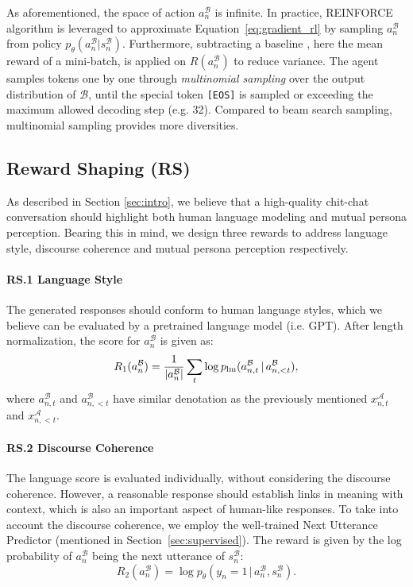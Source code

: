 \documentclass[11pt,a4paper]{article}
\begin{document}
As aforementioned, the space of action $a^\mathcal{B}_n$ is infinite. In practice, REINFORCE algorithm \cite{williams1992simple} is leveraged to approximate Equation~\ref{eq:gradient_rl} by sampling $a^\mathcal{B}_n$ from policy $p_{\theta}(a^\mathcal{B}_n|s^\mathcal{B}_n)$. Furthermore, subtracting a baseline \cite{weaver2001optimal}, here the mean reward of a mini-batch, is applied on $R(a^\mathcal{B}_n)$ to reduce variance. The agent samples tokens one by one through \emph{multinomial sampling} over the output distribution of $\mathcal{B}$, until the special token \texttt{[EOS]} is sampled or exceeding the maximum allowed decoding step (e.g. 32). Compared to beam search sampling, multinomial sampling provides more diversities.

\subsection{Reward Shaping (RS)}\label{sec:reward}

As described in Section \ref{sec:intro}, we believe that a high-quality chit-chat conversation should highlight both human language modeling and mutual persona perception. Bearing this in mind, we design three rewards to address language style, discourse coherence and mutual persona perception respectively.

\paragraph{RS.1 Language Style} The generated responses should conform to human language styles, which we believe can be evaluated by a pretrained language model (i.e. GPT). After length normalization, the score for $a^\mathcal{B}_n$ is given as:
\begin{equation}
    R_1(a^\mathcal{B}_n) = \frac{1}{|a^\mathcal{B}_n|}\sum\limits_{t}\log p_{\rm{lm}}(a^\mathcal{B}_{n,t}\,|\,a^\mathcal{B}_{n,<t}),
\end{equation}
where $a^\mathcal{B}_{n,t}$ and $a^\mathcal{B}_{n,<t}$ have similar denotation as the previously mentioned $x^\mathcal{A}_{n,t}$ and $x^\mathcal{A}_{n,<t}$.

\paragraph{RS.2 Discourse Coherence} The language score is evaluated individually, without considering the discourse coherence. However, a reasonable response should establish links in meaning with context, which is also an important aspect of human-like responses. To take into account the discourse coherence, we employ the well-trained Next Utterance Predictor (mentioned in Section~\ref{sec:supervised}). The reward is given by the log probability of $a^\mathcal{B}_{n}$ being the next utterance of $s^\mathcal{B}_{n}$:
\begin{equation}
    R_2(a^\mathcal{B}_n) = \log p_{\theta}(y_n=1\,|\,a^\mathcal{B}_{n},s^\mathcal{B}_{n}).
\end{equation}
\end{document}
